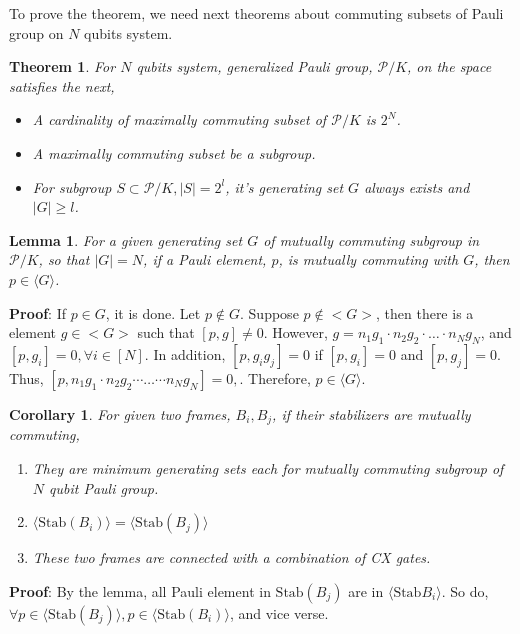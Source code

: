 \documentclass[a4paper,12pt]{article}
\newtheorem{theorem}{Theorem}
\newtheorem{lemma}{Lemma}
\newtheorem{corollary}{Corollary}
\begin{document}
To prove the theorem, we need next theorems\cite{sarkar_sets_2021} about 
commuting subsets of Pauli group on $N$ qubits system.

\begin{theorem}
    For $N$ qubits system, generalized Pauli group, $\mathcal{P}/K$, on the space satisfies the next,

    \begin{itemize}
        \item A cardinality of maximally commuting subset of $\mathcal{P}/K$ is $2^N$.
        \item A maximally commuting subset be a subgroup.
        \item For subgroup $S \subset \mathcal{P}/K, |S| = 2^l$, it's generating set $G$ always exists and $|G| \geq l$.
    \end{itemize}
\end{theorem}


\begin{lemma}
    For a given generating set $G$ of mutually commuting subgroup in $\mathcal{P}/K$, so that $|G| = N$, 
    if a Pauli element, $p$, is mutually commuting with $G$,
    then $p \in \langle G \rangle$.
\end{lemma}

\textbf{Proof}:
If $p \in G$, it is done. Let $p \notin G$.
Suppose $p \notin <G>$, then there is a element $g\in <G>$ such that
$[p, g] \neq 0$. However, $g = n_1 g_1 \cdot n_2 g_2 \cdot \dots \cdot n_N g_N$, and 
$[p, g_i] = 0, \forall i \in [N]$.
In addition, $[p, g_i g_j] =0$ if $[p, g_i] =0$ and $[p, g_j]=0$.
Thus, $[p, n_1 g_1 \cdot n_2 g_2 \cdots \dots \cdots n_N g_N] =0, \!$.
Therefore, $p \in \langle G \rangle$.

\begin{corollary}
    For given two frames, $B_i, B_j$, if their stabilizers are mutually commuting,
    \begin{enumerate}
        \item They are minimum generating sets each for mutually commuting subgroup of $N$ qubit Pauli group.
        \item $\langle \mbox{Stab}(B_i)\rangle = \langle \mbox{Stab}(B_j)\rangle$
        \item These two frames are connected with a combination of CX gates.
    \end{enumerate}
\end{corollary}

\textbf{Proof}: 
By the lemma, all Pauli element in $\mbox{Stab}(B_j)$ are in $\langle \mbox{Stab}{B_i} \rangle$.
So do, $\forall p \in \langle \mbox{Stab}(B_j)\rangle, p \in \langle \mbox{Stab}(B_i)\rangle$, and vice verse. 
\end{document}
